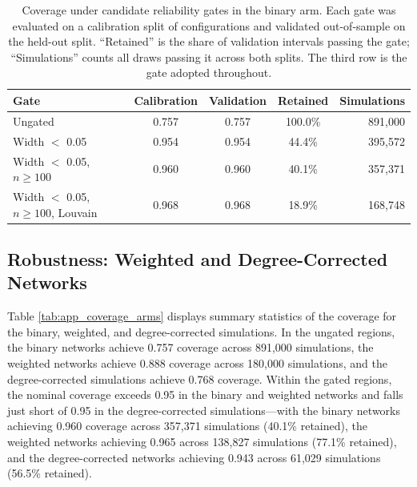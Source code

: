 \documentclass[11pt, letterpaper]{article}
\numberwithin{equation}{section}
\begin{document}
\begin{table}[ht]\centering
\footnotesize
\caption{Coverage under candidate reliability gates in the binary arm. Each
gate was evaluated on a calibration split of configurations and validated
out-of-sample on the held-out split. ``Retained'' is the share of validation
intervals passing the gate; ``Simulations'' counts all draws passing it across
both splits. The third row is the gate adopted throughout.}
\label{tab:coverage_gate}
\begin{tabular}{lcccr}
\toprule
Gate & Calibration & Validation & Retained & Simulations \\
\midrule
Ungated & 0.757 & 0.757 & 100.0\% & 891,000 \\
Width $<$ 0.05 & 0.954 & 0.954 & 44.4\% & 395,572 \\
Width $<$ 0.05, $n \geq 100$ & 0.960 & 0.960 & 40.1\% & 357,371 \\
Width $<$ 0.05, $n \geq 100$, Louvain & 0.968 & 0.968 & 18.9\% & 168,748 \\
\bottomrule
\end{tabular}
\end{table}

\subsection{Robustness: Weighted and Degree-Corrected Networks}
Table \ref{tab:app_coverage_arms} displays summary statistics of the coverage for the binary, weighted, and degree-corrected simulations. In the ungated regions, the binary networks achieve 0.757 coverage across 891,000 simulations, the weighted networks achieve 0.888 coverage across 180,000 simulations, and the degree-corrected simulations achieve 0.768 coverage. Within the gated regions, the nominal coverage exceeds 0.95 in the binary and weighted networks and falls just short of 0.95 in the degree-corrected simulations---with the binary networks achieving 0.960 coverage across 357,371 simulations (40.1\% retained), the weighted networks achieving 0.965 across 138,827 simulations (77.1\% retained), and the degree-corrected networks achieving 0.943 across 61,029 simulations (56.5\% retained). 
\end{document}
